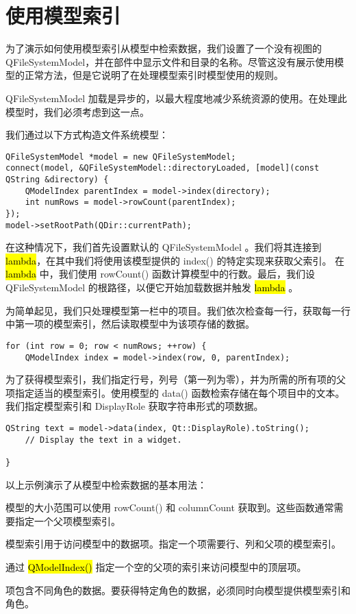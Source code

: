 \section{使用模型索引}

为了演示如何使用模型索引从模型中检索数据，我们设置了一个没有视图的 QFileSystemModel，并在部件中显示文件和目录的名称。尽管这没有展示使用模型的正常方法，但是它说明了在处理模型索引时模型使用的规则。

QFileSystemModel 加载是异步的，以最大程度地减少系统资源的使用。在处理此模型时，我们必须考虑到这一点。

我们通过以下方式构造文件系统模型：

\begin{lstlisting}
QFileSystemModel *model = new QFileSystemModel;
connect(model, &QFileSystemModel::directoryLoaded, [model](const QString &directory) {
    QModelIndex parentIndex = model->index(directory);
    int numRows = model->rowCount(parentIndex);
});
model->setRootPath(QDir::currentPath);
\end{lstlisting}

在这种情况下，我们首先设置默认的 QFileSystemModel 。我们将其连接到 \hl{lambda}，在其中我们将使用该模型提供的 index() 的特定实现来获取父索引。 在 \hl{lambda} 中，我们使用 rowCount() 函数计算模型中的行数。最后，我们设 QFileSystemModel 的根路径，以便它开始加载数据并触发 \hl{lambda} 。

为简单起见，我们只处理模型第一栏中的项目。我们依次检查每一行，获取每一行中第一项的模型索引，然后读取模型中为该项存储的数据。

\begin{lstlisting}
for (int row = 0; row < numRows; ++row) {
    QModelIndex index = model->index(row, 0, parentIndex);
\end{lstlisting}

为了获得模型索引，我们指定行号，列号（第一列为零），并为所需的所有项的父项指定适当的模型索引。使用模型的 data() 函数检索存储在每个项目中的文本。我们指定模型索引和 DisplayRole 获取字符串形式的项数据。

\begin{lstlisting}
QString text = model->data(index, Qt::DisplayRole).toString();
    // Display the text in a widget.

}
\end{lstlisting}

以上示例演示了从模型中检索数据的基本用法：

\begin{compactitem}
\item 模型的大小范围可以使用 rowCount() 和 columnCount 获取到。这些函数通常需要指定一个父项模型索引。
\item 模型索引用于访问模型中的数据项。指定一个项需要行、列和父项的模型索引。
\item 通过 \hl{QModelIndex()} 指定一个空的父项的索引来访问模型中的顶层项。
\item 项包含不同角色的数据。要获得特定角色的数据，必须同时向模型提供模型索引和角色。
\end{compactitem}


